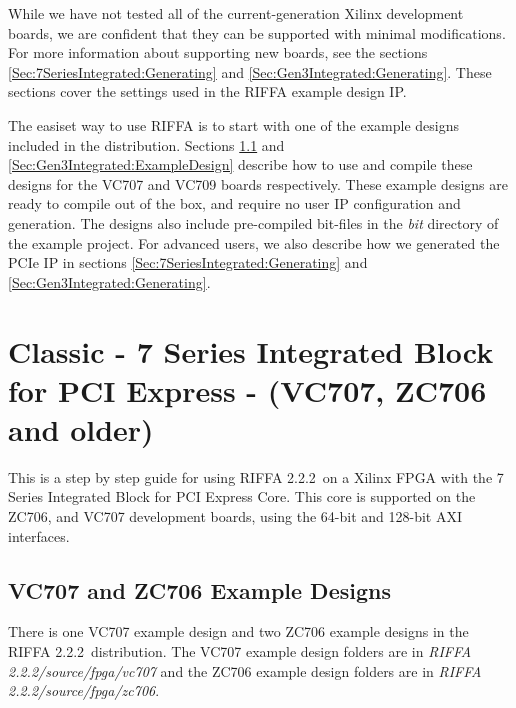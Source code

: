 \documentclass{refrep}
\newcommand{\RIFFAVer}{2.2.2}
\newcommand{\Directory}[1]{\textit{#1}}
\begin{document}
While we have not tested all of the current-generation Xilinx development
boards, we are confident that they can be supported with minimal
modifications. For more information about supporting new boards, see the
sections \ref{Sec:7SeriesIntegrated:Generating} and
\ref{Sec:Gen3Integrated:Generating}. These sections cover the settings used
in the RIFFA example design IP.

The easiset way to use RIFFA is to start with one of the example designs
included in the distribution. Sections \ref{Sec:7SeriesIntegrated:ExampleDesign}
and \ref{Sec:Gen3Integrated:ExampleDesign} describe how to use and compile these
designs for the VC707 and VC709 boards respectively. These example designs are
ready to compile out of the box, and require no user IP configuration and
generation. The designs also include pre-compiled bit-files in the
\Directory{bit} directory of the example project. For advanced users, we also
describe how we generated the PCIe IP in sections
\ref{Sec:7SeriesIntegrated:Generating} and
\ref{Sec:Gen3Integrated:Generating}.

\section{Classic - 7 Series Integrated Block for PCI Express - (VC707, ZC706 and older)}  
This is a step by step guide for using RIFFA \RIFFAVer~on a Xilinx FPGA with the
7 Series Integrated Block for PCI Express Core. This core is supported on the
ZC706, and VC707 development boards, using the 64-bit and 128-bit AXI
interfaces.

\subsection{VC707 and ZC706 Example Designs}
\label{Sec:7SeriesIntegrated:ExampleDesign}
There is one VC707 example design and two ZC706 example designs in the RIFFA
\RIFFAVer~distribution. The VC707 example design folders are in \Directory{RIFFA
  \RIFFAVer/source/fpga/vc707} and the ZC706 example design folders are in
\Directory{RIFFA \RIFFAVer/source/fpga/zc706}.
\end{document}
